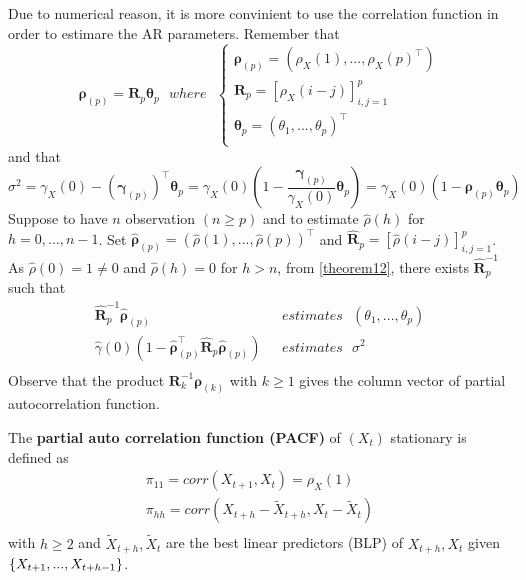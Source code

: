 \begin{remark}
    Due to numerical reason, it is more convinient to use the correlation function in order to estimare the AR parameters. Remember that
    \[
        \boldsymbol{\rho}_{(p)}=\boldsymbol{R}_p\boldsymbol{\theta}_p\ \ \ where\ \ \ 
        \begin{cases}
            \boldsymbol{\rho}_{(p)}=(\rho_X(1),...,\rho_X(p)^\intercal)\\
            \boldsymbol{R}_p=\left[\rho_X(i-j)\right]_{i,j=1}^p\\
            \boldsymbol{\theta}_p=(\theta_1,...,\theta_p)^\intercal\\
        \end{cases}
    \]
    and that
    \[
        \sigma^2=\gamma_X(0)-(\boldsymbol{\gamma}_{(p)})^\intercal\boldsymbol{\theta}_p=\gamma_X(0)\left(1-\frac{\boldsymbol{\gamma}_{(p)}}{\gamma_X(0)}\boldsymbol{\theta}_p\right)=\gamma_X(0)(1-\boldsymbol{\rho}_{(p)}\boldsymbol{\theta}_{p})
    \]
    Suppose to have $n$ observation $(n\ge p)$ and to estimate $\hat{\rho}(h)$ for $h=0,...,n-1$. Set $\hat{\boldsymbol{\rho}}_{(p)}=(\hat{\rho}(1),...,\hat{\rho}(p))^\intercal$ and $\hat{\boldsymbol{R}}_p=\left[\hat{\rho}(i-j)\right]_{i,j=1}^p$. As $\hat{\rho}(0)=1\ne0$ and $\hat{\rho}(h)=0$ for $h>n$, from \ref{theorem12}, there exists $\hat{\boldsymbol{R}}_p^{-1}$ such that
    \begin{equation*}
        \begin{split}
            \hat{\boldsymbol{R}}_p^{-1}\hat{\boldsymbol{\rho}}_{(p)}&\ \ \ estimates\ \ \ (\theta_1,...,\theta_p)\\
            \hat{\gamma}(0)(1-\hat{\boldsymbol{\rho}}_{(p)}^\intercal\hat{\boldsymbol{R}}_p\hat{\boldsymbol{\rho}}_{(p)})&\ \ \ estimates\ \ \ \sigma^2\\
        \end{split}
    \end{equation*} 
    Observe that the product $\boldsymbol{R}_k^{-1}\boldsymbol{\rho}_{(k)}$ with $k\ge1$ gives the column vector of partial autocorrelation function.
\end{remark}

\begin{definition}
    The \textbf{partial auto correlation function (PACF)} of $(X_t)$ stationary is defined as
    \begin{equation*}
        \begin{split}
            \pi_{11}=corr(X_{t+1},X_t)=\rho_X(1)\\
            \pi_{hh}=corr(X_{t+h}-\tilde{X}_{t+h},X_t-\tilde{X}_t)\\
        \end{split}
    \end{equation*}
    with $h\ge2$ and $\tilde{X}_{t+h},\tilde{X}_t$ are the best linear predictors (BLP) of $X_{t+h},X_t$ given $\left\{X_{t+1},...,X_{t+h-1}\right\}$.
\end{definition}

